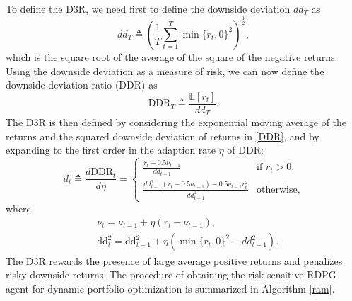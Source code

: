 \documentclass{article}
\begin{document}
To define the D3R, we need first to define the downside deviation $dd_T$ as
\begin{equation*}
    dd_T \triangleq \left( \frac{1}{T} \sum_{t=1}^T \min\{r_t, 0\}^2 \right)^{\frac{1}{2}},
\end{equation*}
which is the square root of the average of the square of the negative returns. Using the downside deviation as a measure of risk, we can now define the downside deviation ratio (DDR) as 
\begin{equation}\label{DDR}
    \text{DDR}_T \triangleq \frac{\mathbb{E}[r_t]}{dd_T}.
\end{equation}
The D3R is then defined by considering the exponential moving average of the returns and the squared downside deviation of returns in \eqref{DDR}, and by expanding to the first order in the adaption rate $\eta$ of DDR:
\begin{equation}\label{D3R}
d_t \triangleq \frac{d\text{DDR}_t}{d\eta} = \begin{cases}
\frac{r_t-0.5\nu_{t-1}}{dd_{t-1}} &\text{if $r_t>0,$}\\
\frac{dd_{t-1}^2(r_t-0.5\nu_{t-1})-0.5\nu_{t-1}r_t^2}{dd_{t-1}^3} &\text{otherwise,}
\end{cases}
\end{equation}
where 
\begin{equation*}
\begin{aligned}
    &\nu_t=\nu_{t-1}+\eta(r_t-\nu_{t-1}),\\
    &\text{dd}_t^2=\text{dd}^2_{t-1} + \eta(\min\{r_t,0\}^2-dd^2_{t-1}).
\end{aligned}
\end{equation*}
The D3R rewards the presence of large average positive returns and penalizes risky downside returns. The procedure of obtaining the risk-sensitive RDPG agent for dynamic portfolio optimization is summarized in Algorithm \ref{ram}.
\end{document}
